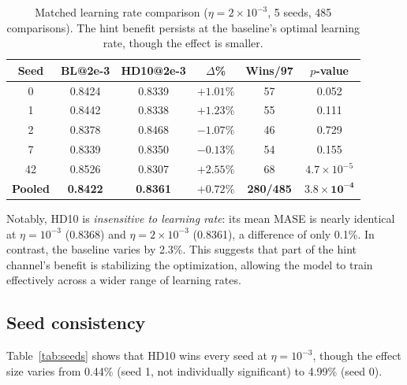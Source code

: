 \documentclass[11pt]{article}
\begin{document}
\begin{table}[t]
\centering
\caption{Matched learning rate comparison ($\eta = 2 \times 10^{-3}$, 5 seeds, 485 comparisons). The hint benefit persists at the baseline's optimal learning rate, though the effect is smaller.}
\label{tab:matchedlr}
\small
\begin{tabular}{cccccc}
\toprule
\textbf{Seed} & \textbf{BL@2e-3} & \textbf{HD10@2e-3} & \textbf{$\Delta$\%} & \textbf{Wins/97} & \textbf{$p$-value} \\
\midrule
0 & 0.8424 & 0.8339 & $+1.01\%$ & 57 & 0.052 \\
1 & 0.8442 & 0.8338 & $+1.23\%$ & 55 & 0.111 \\
2 & 0.8378 & 0.8468 & $-1.07\%$ & 46 & 0.729 \\
7 & 0.8339 & 0.8350 & $-0.13\%$ & 54 & 0.155 \\
42 & 0.8526 & 0.8307 & $+2.55\%$ & 68 & $4.7 \times 10^{-5}$ \\
\midrule
\textbf{Pooled} & \textbf{0.8422} & \textbf{0.8361} & \textbf{$+0.72\%$} & \textbf{280/485} & $\mathbf{3.8 \times 10^{-4}}$ \\
\bottomrule
\end{tabular}
\end{table}

Notably, HD10 is \emph{insensitive to learning rate}: its mean MASE is nearly identical at $\eta = 10^{-3}$ (0.8368) and $\eta = 2 \times 10^{-3}$ (0.8361), a difference of only 0.1\%. In contrast, the baseline varies by 2.3\%. This suggests that part of the hint channel's benefit is stabilizing the optimization, allowing the model to train effectively across a wider range of learning rates.

\subsection{Seed consistency}

Table~\ref{tab:seeds} shows that HD10 wins every seed at $\eta = 10^{-3}$, though the effect size varies from 0.44\% (seed 1, not individually significant) to 4.99\% (seed 0).
\end{document}
